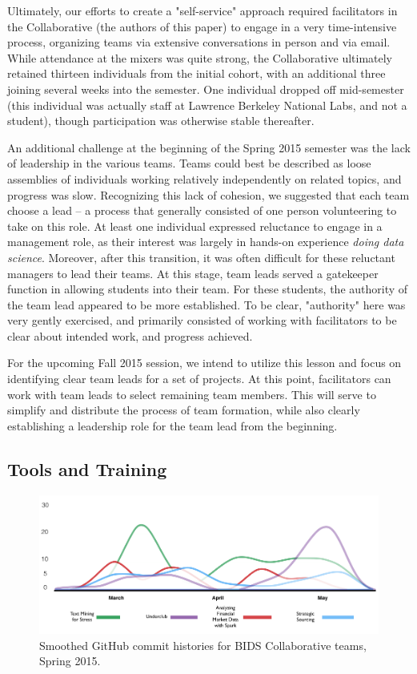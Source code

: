 \documentclass{sig-alternate}
\begin{document}
Ultimately, our efforts to create a "self-service" approach required facilitators in the Collaborative (the authors of this paper) to engage in a very time-intensive process, organizing teams via extensive conversations in person and via email. While attendance at the mixers was quite strong, the Collaborative ultimately retained thirteen individuals from the initial cohort, with an additional three joining several weeks into the semester. One individual dropped off mid-semester (this individual was actually staff at Lawrence Berkeley National Labs, and not a student), though participation was otherwise stable thereafter.

An additional challenge at the beginning of the Spring 2015 semester was the lack of leadership in the various teams. Teams could best be described as loose assemblies of individuals working relatively independently on related topics, and progress was slow. Recognizing this lack of cohesion, we suggested that each team choose a lead -- a process that generally consisted of one person volunteering to take on this role. At least one individual expressed reluctance to engage in a management role, as their interest was largely in hands-on experience \emph{doing data science}. Moreover, after this transition, it was often difficult for these reluctant managers to lead their teams.  At this stage, team leads served a gatekeeper function in allowing students into their team. For these students, the authority of the team lead appeared to be more established. To be clear, "authority" here was very gently exercised, and primarily consisted of working with facilitators to be clear about intended work, and progress achieved. 

For the upcoming Fall 2015 session, we intend to utilize this lesson and focus on identifying clear team leads for a set of projects. At this point, facilitators can work with team leads to select remaining team members. This will serve to simplify and distribute the process of team formation, while also clearly establishing a leadership role for the team lead from the beginning.

\subsection{Tools and Training}

\begin{figure}
\centerline{\includegraphics[scale=0.45]{dsc_figure_gitcommits.png}}
\caption{Smoothed GitHub commit histories for BIDS Collaborative teams, Spring 2015.}
\label{fig:gitcommits}
\end{figure}
\end{document}
